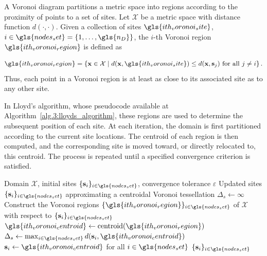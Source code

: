 A Voronoi diagram partitions a metric space into regions according to the proximity of points to a set of sites. Let $\mathcal{X}$ be a metric space with distance function $d(\cdot,\cdot)$. Given a collection of sites $\gls{ith_voronoi_site}$, $i\in \gls{nodes_set}=\{1,\ldots,\gls{n_D}\}$, the $i$-th Voronoi region $\gls{ith_voronoi_region}$ is defined as

\begin{equation}
    \gls{ith_voronoi_region}
    =
    \left\{
        \mathbf{x} \in \mathcal{X}
        \mid
        d(\mathbf{x},\gls{ith_voronoi_site})
        \leq
        d(\mathbf{x},\mathbf{s}_j)
        \text{ for all } j \neq i
    \right\}.
\end{equation}
Thus, each point in a Voronoi region is at least as close to its associated site as to any other site.

In Lloyd's algorithm, whose pseudocode available at Algorithm~\ref{alg.3:lloyds_algorithm}, these regions are used to determine the subsequent position of each site. At each iteration, the domain is first partitioned according to the current site locations. The centroid of each region is then computed, and the corresponding site is moved toward, or directly relocated to, this centroid. The process is repeated until a specified convergence criterion is satisfied.

\begin{algorithm}[h]
\caption{Lloyd's algorithm}
\label{alg.3:lloyds_algorithm}
\begin{algorithmic}[1]
\Require Domain $\mathcal{X}$, initial sites $\{\mathbf{s}_i\}_{i \in \gls{nodes_set}}$, convergence tolerance $\varepsilon$
\Ensure Updated sites $\{\mathbf{s}_i\}_{i \in \gls{nodes_set}}$ approximating a centroidal Voronoi tessellation
\State $\Delta_s \gets \infty$
    \State Construct the Voronoi regions $\{\gls{ith_voronoi_region}\}_{i \in \gls{nodes_set}}$ of $\mathcal{X}$ with respect to $\{\mathbf{s}_i\}_{i \in \gls{nodes_set}}$ 
        \State $\gls{ith_voronoi_centroid} \gets \text{centroid}(\gls{ith_voronoi_region})$
    \EndFor
    \State $\Delta_s \gets \max_{i \in \gls{nodes_set}} d(\mathbf{s}_i, \gls{ith_voronoi_centroid})$
    \State $\mathbf{s}_i \gets \gls{ith_voronoi_centroid}$ for all $i \in \gls{nodes_set}$
\EndWhile
\State \Return $\{\mathbf{s}_i\}_{i \in \gls{nodes_set}}$
\end{algorithmic}
\end{algorithm}

